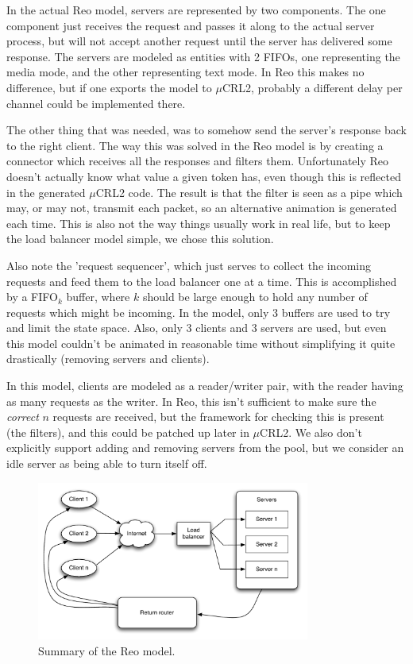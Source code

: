 \documentclass[a4paper]{article}
\newcommand{\re}{Reo\xspace}
\newcommand{\mcrl}{$\mu$CRL2\xspace}
\begin{document}
In the actual \re model, servers are represented by two components. The one
component just receives the request and passes it along to the actual server
process, but will not accept another request until the server has delivered some
response. The servers are modeled as entities with 2 FIFOs, one representing
the media mode, and the other representing text mode. In \re this makes no
difference, but if one exports the model to \mcrl, probably a different delay
per channel could be
implemented there.

The other thing that was needed, was to somehow send the server's response back
to the right client. The way this was solved in the \re model is by creating a
connector which receives all the responses and filters them. Unfortunately \re
doesn't actually know what value a given token has, even though this is
reflected in the generated \mcrl code. The result is that the filter is seen as
a pipe which may, or may not, transmit each packet, so an alternative animation
is generated each time. This is also not the way things usually work in real
life, but to keep the load balancer model simple, we chose this solution.

Also note the 'request sequencer', which just serves to collect the incoming
requests and feed them to the load balancer one at a time. This is accomplished
by a FIFO$_k$ buffer, where $k$ should be large enough to hold any number of
requests which might be incoming. In the model, only 3 buffers are used to try
and limit the state space. Also, only 3 clients and 3 servers are used, but even
this model couldn't be animated in reasonable time without simplifying it quite
drastically (removing servers and clients).

In this model, clients are modeled as a reader/writer pair, with the reader
having as many requests as the writer. In \re, this isn't sufficient to make
sure the \emph{correct} $n$ requests are received, but the framework for
checking this is present (the filters), and this could be patched up later in
\mcrl. We also don't explicitly support adding and removing servers from the
pool, but we consider an idle server as being able to turn itself off.

\begin{figure}[h]
    \begin{center}
        \includegraphics[width=0.8\textwidth]{images/reo-model.pdf}
    \end{center}
    \caption{Summary of the \re model.}
    \label{fig:reo}
\end{figure}
\end{document}

